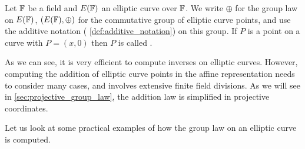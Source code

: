 \begin{notation}
Let $\mathbb{F}$ be a field and $E(\mathbb{F})$ an elliptic curve over $\mathbb{F}$. We write $\oplus$ for the group law on $E(\mathbb{F})$, $(E(\mathbb{F}),\oplus)$ for the commutative group of elliptic curve points, and use the additive notation (\notationname{} \ref{def:additive_notation}) on this group. If $P$ is a point on a  curve with $P=(x,0)$ then $P$ is called .
\end{notation}
As we can see, it is very efficient to compute inverses on elliptic curves. However, computing the addition of elliptic curve points in the affine representation needs to consider many cases, and involves extensive finite field divisions. As we will see in \ref{sec:projective_group_law}, the addition law is simplified in projective coordinates.

Let us look at some practical examples of how the group law on an elliptic curve is computed.

